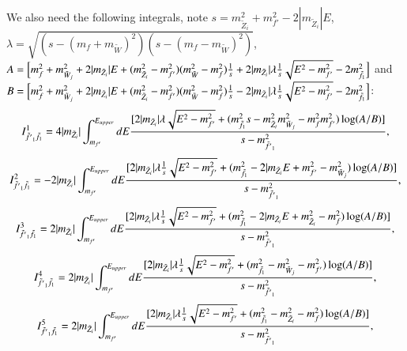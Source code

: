 \documentclass[final,3p,times]{elsarticle}
\begin{document}
We also need the following integrals, note $s = m_{\tilde{Z}_i}^2 + m_{f'}^2 - 2|m_{\tilde{Z}_i}|E$, $\lambda = \sqrt{(s-(m_{f}+m_{\tilde{W}})^2)(s-(m_{f}-m_{\tilde{W}})^2)}$, $A = \Big[m_{f}^2 + m_{\tilde{W}_j}^2 + 2|m_{\tilde{Z}_i}|E + (m_{\tilde{Z}_i}^2 - m_{f'}^2)(m_{\tilde{W}}^2 - m_{f}^2){1 \over s} + 2|m_{\tilde{Z}_i}| \lambda {1 \over s} \sqrt{E^2 - m_{f'}^2}  - 2m_{\tilde{f}_1}^2\Big]$ and $B = \Big[m_{f}^2 + m_{\tilde{W}_j}^2 + 2|m_{\tilde{Z}_i}|E + (m_{\tilde{Z}_i}^2 - m_{f'}^2)(m_{\tilde{W}}^2 - m_{f}^2){1 \over s} - 2|m_{\tilde{Z}_i}|\lambda {1 \over s} \sqrt{E^2 - m_{f'}^2} - 2m_{\tilde{f}_1}^2\Big]$:
\begin{equation}
\begin{aligned}
I_{\tilde{f'}_1 \tilde{f}_1}^{1} = 4|m_{\tilde{Z}_i}| \int_{m_{f'}}^{E_{upper}} dE {[2|m_{\tilde{Z}_i}| \lambda \sqrt{E^2 - m_{f'}^2}  + (m_{\tilde{f}_1}^2 s - m_{\tilde{Z}_i}^2 m_{\tilde{W}_j}^2 - m_{f}^2 m_{f'}^2) \log(A/B)] \over s - m_{\tilde{f'}_1}^2},
\end{aligned}
\end{equation}
\begin{equation}
\begin{aligned}
I_{\tilde{f'}_1 \tilde{f}_1}^{2} = -2|m_{\tilde{Z}_i}| \int_{m_{f'}}^{E_{upper}} dE {[2|m_{\tilde{Z}_i}| \lambda {1 \over s} \sqrt{E^2-m_{f'}^2}  + (m_{\tilde{f}_1}^2 - 2|m_{\tilde{Z}_i}E + m_{f'}^2 - m_{\tilde{W}_j}^2)\log(A/B)]  \over s - m_{\tilde{f'}_1}^2},
\end{aligned}
\end{equation}
\begin{equation}
\begin{aligned}
I_{\tilde{f'}_1 \tilde{f}_1}^{3} = 2|m_{\tilde{Z}_i}| \int_{m_{f'}}^{E_{upper}} dE {[2|m_{\tilde{Z}_i}|\lambda {1 \over s}\sqrt{E^2-m_{f'}^2}  + (m_{\tilde{f}_1}^2 - 2|m_{\tilde{Z}_i}E + m_{\tilde{Z}_i}^2 - m_{f}^2)\log(A/B)]  \over s - m_{\tilde{f'}_1}^2},
\end{aligned}
\end{equation}
\begin{equation}
\begin{aligned}
I_{\tilde{f'}_1 \tilde{f}_1}^{4} = 2|m_{\tilde{Z}_i}| \int_{m_{f'}}^{E_{upper}} dE {[2|m_{\tilde{Z}_i}|\lambda {1 \over s}\sqrt{E^2-m_{f'}^2} + (m_{\tilde{f}_1}^2 - m_{\tilde{W}_j}^2 - m_{f'}^2)\log(A/B)]  \over s - m_{\tilde{f'}_1}^2},
\end{aligned}
\end{equation}
\begin{equation}
\begin{aligned}
I_{\tilde{f'}_1 \tilde{f}_1}^{5} = 2|m_{\tilde{Z}_i}| \int_{m_{f'}}^{E_{upper}} dE {[2|m_{\tilde{Z}_i}| \lambda {1 \over s} \sqrt{E^2-m_{f'}^2}  + (m_{\tilde{f}_1}^2 - m_{\tilde{Z}_i}^2 - m_{f}^2)\log(A/B)]  \over s - m_{\tilde{f'}_1}^2},
\end{aligned}
\end{equation}
\end{document}
